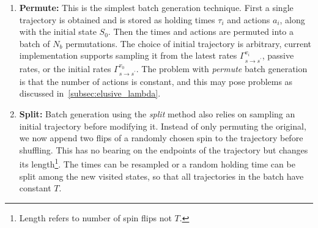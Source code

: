 \begin{enumerate}[label=\roman*)]
	\item \textbf{Permute:} This is the simplest batch generation technique. First a single trajectory is obtained and is stored as holding times $\tau_i$ and actions $a_i$, along with the initial state $S_0$. Then the times and actions are permuted into a batch of $N_b$ permutations. The choice of initial trajectory is arbitrary, current implementation supports sampling it from the latest rates $\Gamma^{v_i}_{s \rightarrow s^\prime}$, passive rates, or the initial rates $\Gamma^{v_0}_{s \rightarrow s^\prime}$. The problem with \emph{permute} batch generation is that the number of actions is constant, and this may pose problems as discussed in~\ref{subsec:elusive_lambda}.
	
	\item \textbf{Split:} Batch generation using the \emph{split} method also relies on sampling an initial trajectory before modifying it. Instead of only permuting the original, we now append two flips of a randomly chosen spin to the trajectory before shuffling. This has no bearing on the endpoints of the trajectory but changes its length\footnote{Length refers to number of spin flips not $T$.}. The times can be resampled or a random holding time can be split among the new visited states, so that all trajectories in the batch have constant $T$.
	

\end{enumerate}
